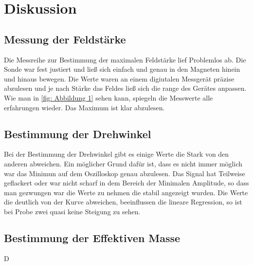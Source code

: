 \section{Diskussion}
\label{sec:Diskussion}

\subsection{Messung der Feldstärke}
Die Messreihe zur Bestimmung der maximalen Feldstärke lief Problemlos ab. Die Sonde war fest 
justiert und ließ sich einfach und genau in den Magneten hinein und hinaus bewegen. Die Werte waren 
an einem digiutalen Messgerät präzise abzulesen und je nach Stärke das Feldes ließ sich die range des 
Gerätes anpassen. Wie man in \ref{fig: Abbildung 1} sehen kann, spiegeln die Messwerte alle erfahrungen wieder.
Das Maximum ist klar abzulesen.

\subsection{Bestimmung der Drehwinkel}
Bei der Bestimmung der Drehwinkel gibt es einige Werte die Stark von den anderen abweichen. Ein möglicher 
Grund dafür ist, dass es nicht immer möglich war das Minimun auf dem Oszilloskop genau abzulesen. Das Signal 
hat Teilweise geflackert oder war nicht scharf in dem Bereich der Minimalen Amplitude, so dass man gezwungen war die Werte 
zu nehmen die stabil angezeigt wurden. Die Werte die deutlich von der Kurve abweichen, beeinflussen die lineare Regression,
so ist bei Probe zwei quasi keine Steigung zu sehen.

\subsection{Bestimmung der Effektiven Masse}
D

